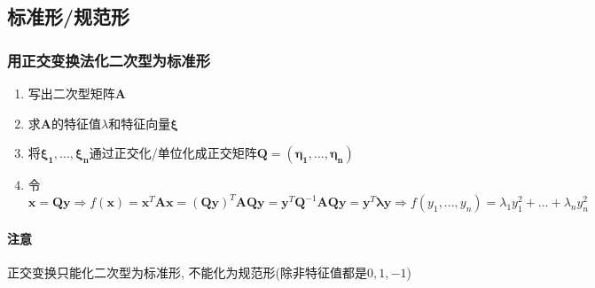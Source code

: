 \subsection{标准形/规范形}
\subsubsection{用正交变换法化二次型为标准形}
\begin{enumerate}\label{ref:求标准形}
\item 写出二次型矩阵$ \bm{A} $
\item 求$ \bm{A} $的特征值$ \lambda $和特征向量$ \bm{\xi} $
\item 将$ \bm{\xi_{1}},..., \bm{\xi_{n}} $通过正交化/单位化成正交矩阵$ \bm{Q}=(\bm{\eta_{1}},..., \bm{\eta_{n}}) $
\item 令$ \bm{x}=\bm{Q}\bm{y}\Rightarrow f(\bm{x})=\bm{x}^{T}\bm{A}\bm{x}=(\bm{Q}\bm{y})^{T}\bm{A}\bm{Q}\bm{y}=\bm{y}^{T}\bm{Q}^{-1}\bm{A}\bm{Q}\bm{y}=\bm{y}^{T}\bm{\lambda}\bm{y}\Rightarrow f(y_{1},..., y_{n})=\lambda_{1}y_{1}^{2}+... +\lambda_{n}y_{n}^{2} $
\end{enumerate}
\paragraph{注意} 正交变换只能化二次型为标准形, 不能化为规范形(除非特征值都是$ 0, 1, -1 $)\par